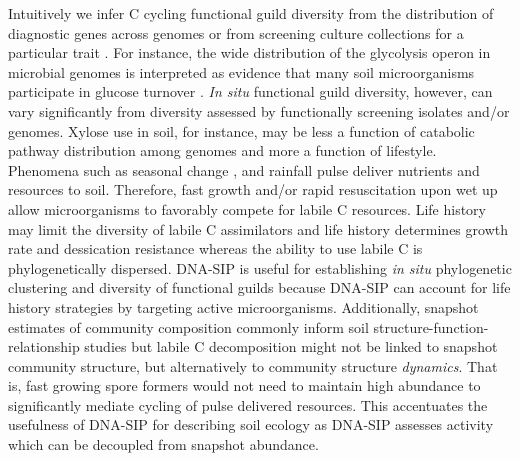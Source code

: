 Intuitively we infer C cycling functional guild diversity from the distribution
of diagnostic genes across genomes \citep{Berlemont2013} or from screening
culture collections for a particular trait \citep{Martiny2013}. For
instance, the wide distribution of the glycolysis operon in microbial
genomes is interpreted as evidence that many soil microorganisms
participate in glucose turnover \citep{McGuire2010}. \textit{In situ}
functional guild diversity, however, can vary significantly from diversity
assessed by functionally screening isolates and/or genomes. Xylose use in
soil, for instance, may be less a function of catabolic pathway
distribution among genomes and more a function of lifestyle. Phenomena
such as seasonal change \citep{Schmidt2007}, and rainfall
\citep{Placella2012} pulse deliver nutrients and resources to soil.
Therefore, fast growth and/or rapid resuscitation upon wet up
\citep{Placella2012} allow microorganisms to favorably compete for labile
C resources. Life history may limit the diversity of labile C assimilators
and life history determines growth rate and dessication resistance whereas
the ability to use labile C is phylogenetically dispersed. DNA-SIP is
useful for establishing \textit{in situ} phylogenetic clustering and
diversity of functional guilds because DNA-SIP can account for life
history strategies by targeting active microorganisms. Additionally,
snapshot estimates of community composition commonly inform soil
structure-function-relationship studies \citep{Fierer} but
labile C decomposition might not be linked to snapshot community structure, but
alternatively to community structure \textit{dynamics}. That is, fast growing
spore formers would not need to maintain high abundance to significantly
mediate cycling of pulse delivered resources. This accentuates the usefulness
of DNA-SIP for describing soil ecology as DNA-SIP assesses activity which can
be decoupled from snapshot abundance.


